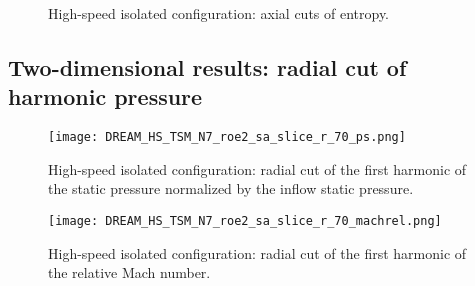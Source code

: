 \begin{figure}[htp]
  \centering
  \caption{High-speed isolated configuration: axial cuts of entropy.}
   \label{fig:dream_hs_hb_axial_cut_entropy}
\end{figure}

\subsection{Two-dimensional results: radial cut of harmonic pressure}
\label{sub:dream_hs_hb_radial_cuts}

\begin{figure}[htp]
  \centering
  \texttt{[image: DREAM\_HS\_TSM\_N7\_roe2\_sa\_slice\_r\_70\_ps.png]}
  \caption{High-speed isolated configuration: radial cut of the first harmonic of the
  static pressure normalized by the inflow static pressure.}
  \label{fig:dream_hs_hb_radial_cuts}
\end{figure}

\begin{figure}[htp]
  \centering
  \texttt{[image: DREAM\_HS\_TSM\_N7\_roe2\_sa\_slice\_r\_70\_machrel.png]}
  \caption{High-speed isolated configuration: radial cut of the first harmonic of the
  relative Mach number.}
  \label{fig:dream_hs_hb_radial_cuts_machrel}
\end{figure}